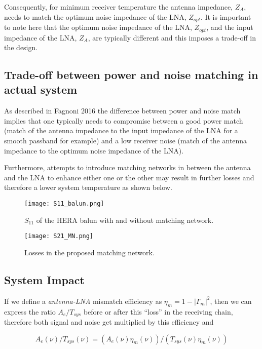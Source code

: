 \documentclass[11pt]{article}
\begin{document}
Consequently, for minimum receiver temperature the antenna impedance, $Z_A$, needs to match the optimum noise impedance of the LNA, $Z_{opt}$. It is important to note here that the optimum noise impedance of the LNA, $Z_{opt}$, and the input impedance of the LNA, $Z_A$, are typically different and this imposes a trade-off in the design.

\subsection{Trade-off between power and noise matching in actual system}

As described in Fagnoni 2016 %
the difference between power and noise match implies that one typically needs to compromise between a good power match (match of the antenna impedance to the input impedance of the LNA for a smooth passband for example) and a low receiver noise (match of the antenna impedance to the optimum noise impedance of the LNA). 

Furthermore, attempts to introduce matching networks in between the antenna and the LNA to enhance either one or the other may result in further losses and therefore a lower system temperature as shown below. 

\begin{figure}[ht]
\centering
\texttt{[image: S11\_balun.png]}
\caption{\small $S_{11}$ of the HERA balun with and without matching network.}
\label{Fig:S11_balun}
\end{figure}

\begin{figure}[ht]
\centering
\texttt{[image: S21\_MN.png]}
\caption{\small Losses in the proposed matching network.}
\label{Fig:S11_MN}
\end{figure}

\subsection{System Impact}
If we define a {\em antenna-LNA} mismatch efficiency as $\eta_m = 1-|\Gamma_{m}|^2$, then we can express the ratio $A_e/T_{sys}$ before or after this ``loss'' in the receiving chain, therefore both signal and noise get multiplied by this efficiency and

\begin{equation}
A_e(\nu)/T_{sys}(\nu) = (A_e(\nu)\eta_m(\nu))/(T_{sys}(\nu)\eta_m(\nu))
\end{equation}
\end{document}
